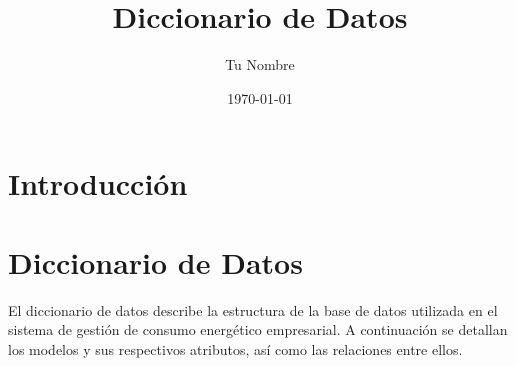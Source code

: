 \documentclass[12pt]{article}
\title{Diccionario de Datos}
\author{Tu Nombre}
\date{\today}
\begin{document}
\maketitle

\section*{Introducción}

\newpage

\section*{Diccionario de Datos}

El diccionario de datos describe la estructura de la base de datos utilizada en el sistema de gestión de consumo energético empresarial. A continuación se detallan los modelos y sus respectivos atributos, así como las relaciones entre ellos.
\end{document}
